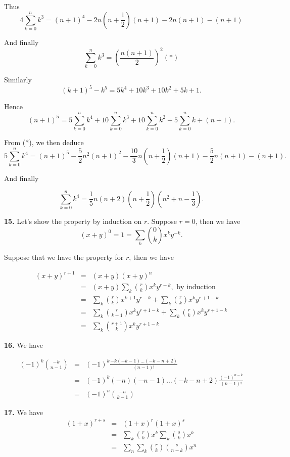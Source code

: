 \documentclass[a4paper,12pt]{article}
\newcommand{\newpar}[1]{\bigskip \noindent \textbf{#1.}}
\begin{document}
Thus
\[ 4 \sum_{k=0}^n k^3 = (n+1)^4 - 2 n\left(n +
\frac{1}{2}\right)(n+1) - 2 n(n+1) - (n+1)\]

And finally
\[ \sum_{k=0}^n k^3 = \left( \frac{n(n+1)}{2} \right)^2 (*)\]

Similarly
\[ (k+1)^5 - k^5 = 5 k^4 + 10 k^3 + 10 k^2 + 5 k + 1.\]

Hence
\[ (n+1)^5 = 5 \sum_{k=0}^n k^4 + 10 \sum_{k=0}^n k^3 + 10
\sum_{k=0}^n k^2 + 5 \sum_{k=0}^n k + (n+1).\]

From (*), we then deduce
\[ 5 \sum_{k=0}^n k^4 = (n+1)^5 - \frac{5}{2} n^2(n+1)^2 -
\frac{10}{3}n\left(n+\frac{1}{2}\right) (n+1) -
\frac{5}{2}n(n+1)-(n+1).\]

And finally

\[ \sum_{k=0}^n k^4 = \frac{1}{5}n(n+2)\left(n+\frac{1}{2}\right)
\left(n^2 + n - \frac{1}{3}\right).\]

\newpar{15} Let's show the property by induction on $r$.  Suppose
$r=0$, then we have
\[ (x+y)^0 = 1 = \sum_k {0 \choose k} x^k y^{-k}.\]

Suppose that we have the property for $r$, then we have

\begin{eqnarray*}
  (x+y)^{r+1} &=& (x + y) (x+y)^n \\
  &=& (x+y) \sum_k {r \choose k} x^k y^{r-k}, \mbox{ by induction} \\
  &=& \sum_k {r \choose k} x^{k+1} y^{r-k} + \sum_k {r \choose k} x^k y^{r+1-k} \\
  &=& \sum_k {r \choose {k-1}} x^k y^{r+1-k} + \sum_k {r \choose k} x^k y^{r+1-k} \\
  &=& \sum_k {{r+1} \choose k} x^k y^{r+1-k}
\end{eqnarray*}

\newpar{16} We have

\begin{eqnarray*}
  (-1)^k {{-k} \choose {n-1}} &=& (-1)^k \frac{-k (-k-1)\ldots
    (-k-n+2)}{(n-1)!} \\
  &=& (-1)^k (-n) (-n-1)\ldots(-k-n+2) \frac{(-1)^{n-k}}{(k-1)!} \\
  &=& (-1)^n {{-n} \choose {k-1}}
\end{eqnarray*}

\newpar{17} We have
\begin{eqnarray*}
  (1+x)^{r+s} &=& (1+x)^r (1+x)^s \\
  &=& \sum_k {r \choose k} x^k \sum_k {s \choose k} x^k \\
  &=& \sum_n \sum_k {r \choose k} {s \choose {n-k}} x^n \\
\end{eqnarray*}
\end{document}
